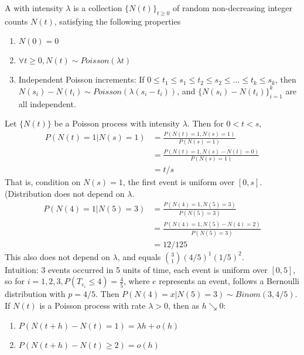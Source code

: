 \documentclass[11pt]{article}
\begin{document}
   	
   	A  with intensity $\lambda$ is a collection $\{N(t)\}_{t\geq 0}$ of random non-decreasing integer counts $N(t)$, satisfying the following properties
   	\begin{enumerate}
   		\item $N(0) = 0$
   		\item $\forall t \geq 0, N(t) \sim Poisson(\lambda t)$
   		\item Independent Poisson increments: If $0 \leq t_1 \leq s_1 \leq t_2 \leq s_2 \leq \hdots \leq t_k \leq s_k$, then $N(s_i) - N(t_i) \sim Poisson(\lambda(s_i - t_i))$, and $\{N(s_i) - N(t_i)\}_{i=1}^k$ are all independent.
   	\end{enumerate}
   	\example
   	Let $\{N(t)\}$ be a Poisson process with intensity $\lambda$. Then for $0 < t <s$,
   	\begin{align*}
   		P(N(t) = 1| N(s) = 1) &= \frac{P(N(t) = 1, N(s) = 1)}{P(N(s) = 1)}\\
   		&= \frac{P(N(t) = 1, N(s) - N(t) = 0)}{P(N(s) = 1)} \\
   		&= t/s
   	\end{align*}
   	That is, condition on $N(s) = 1$, the first event is uniform over $[0, s]$. (Distribution does not depend on $\lambda$.
   	\example
   	\begin{align*}
   		P(N(4) = 1| N(5) = 3) &= \frac{P(N(4) = 1, N(5) = 3)}{P(N(5) = 3)} \\
   		&= \frac{P(N(4) = 1, N(5) - N(4) = 2)}{P(N(5) = 3)} \\
   		&= 12/125
   	\end{align*}
   	This also does not depend on $\lambda$, and equals ${3 \choose 1}(4/5)^1 (1/5)^2$.\\
   	Intuition: 3 events occurred in 5 units of time, each event is uniform over $[0,5]$, so for $i = 1, 2, 3, P(T_{e_i} \leq 4) = \frac{4}{5}$, where $e$ represents an event, follows a Bernoulli distribution with $p = 4/5$. Then $P(N(4) = x|N(5) = 3) \sim Binom(3, 4/5)$.  
   	\proposition
   	If $N(t)$ is a Poisson process with rate $\lambda > 0$, then as $h \searrow 0$:
   	\begin{enumerate}
   		\item $P(N(t+h) - N(t) = 1) = \lambda h +o(h)$
   		\item $P(N(t+h) - N(t) \geq 2) = o(h)$
   	\end{enumerate}
\end{document}
